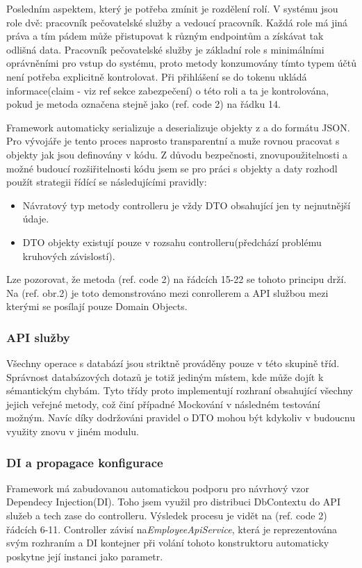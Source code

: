 \documentclass[
  biblatex,
  glossaries,
  index
]{kidiplom}
\begin{document}
Posledním aspektem, který je potřeba zmínit je rozdělení rolí. V systému jsou role dvě: pracovník pečovatelské služby a vedoucí pracovník. Každá role má jiná práva a tím pádem může přistupovat k různým endpointům a získávat tak odlišná data. Pracovník pečovatelské služby je základní role s minimálními oprávněními pro vstup do systému, proto metody konzumovány tímto typem účtů není potřeba explicitně kontrolovat. Při přihlášení se do tokenu ukládá informace(claim - viz ref sekce zabezpečení) o této roli a ta je kontrolována, pokud je metoda označena stejně jako (ref. code 2) na řádku 14.

Framework automaticky serializuje a deserializuje objekty z a do formátu JSON. Pro vývojáře je tento proces naprosto transparentní a muže rovnou pracovat s objekty jak jsou definovány v kódu. Z důvodu bezpečnosti, znovupoužitelnosti a možné budoucí rozšiřitelnosti kódu jsem se pro práci s objekty a daty rozhodl použít strategii řídící se následujícími pravidly: 
\begin{itemize}
	\item Návratový typ metody controlleru je vždy DTO obsahující jen ty nejnutnější údaje.
	\item DTO objekty existují pouze v rozsahu controlleru(předchází problému kruhových závislostí).
\end{itemize} 
Lze pozorovat, že metoda (ref. code 2) na řádcích 15-22 se tohoto principu drží. Na (ref. obr.2) je toto demonstrováno mezi conrollerem a API službou mezi kterými se posílají pouze Domain Objects.

\subsubsection{API služby}
Všechny operace s databází jsou striktně prováděny pouze v této skupině tříd. Správnost databázových dotazů je totiž jediným místem, kde může dojít k sémantickým chybám. Tyto třídy proto implementují rozhraní obsahující všechny jejich veřejné metody, což činí případné Mockování v následném testování možným. Navíc díky dodržováni pravidel o DTO mohou být kdykoliv v budoucnu využity znovu v jiném modulu. 

\subsubsection{DI a propagace konfigurace}
Framework má zabudovanou automatickou podporu pro návrhový vzor Dependecy Injection(DI). Toho jsem využil pro distribuci DbContextu do API služeb a tech zase do controlleru. Výsledek procesu je vidět na (ref. code 2) řádcích 6-11. Controller závisí na\textit{EmployeeApiService}, která je reprezentována svým rozhraním a DI kontejner při volání tohoto konstruktoru automaticky poskytne její instanci jako parametr.
\end{document}
